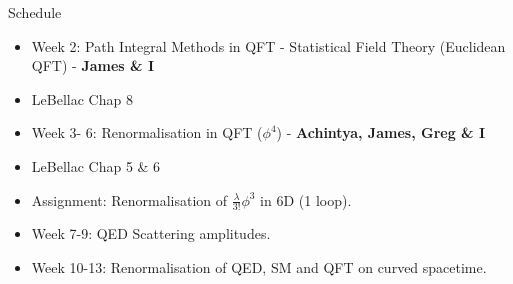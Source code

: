 
Schedule
\begin{itemize}
    \item Week 2: Path Integral Methods in QFT - Statistical Field Theory (Euclidean QFT) - \textbf{James \& I}
    \item LeBellac Chap 8
    \item Week 3- 6: Renormalisation in QFT ($\phi^{4}$) - \textbf{Achintya, James, Greg \& I}
    \item LeBellac Chap 5 \& 6
    \item Assignment: Renormalisation of $\frac{\lambda}{3!} \phi^{3}$ in 6D (1 loop).
    \item Week 7-9: QED Scattering amplitudes.
    \item Week 10-13: Renormalisation of QED, SM and QFT on curved spacetime.
\end{itemize}
